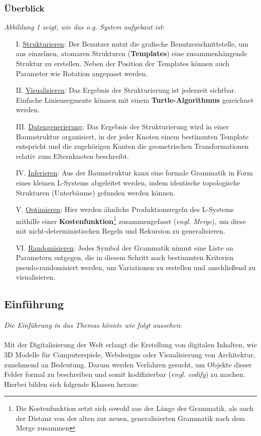 \documentclass[11pt]{article}
\begin{document}
    \subsubsection{Überblick}
    \textit{Abbildung 1 zeigt, wie das o.g. System aufgebaut ist}:
    \begin{itemize}
        \item[I.] \underline{Strukturieren}: Der Benutzer nutzt die grafische Benutzerschnittstelle, um aus
        einzelnen, atomaren Strukturen (\textbf{Templates}) eine zusammenhängende Struktur zu erstellen.
        Neben der Position der Templates können auch Parameter wie Rotation angepasst
        werden.
        \item[II.] \underline{Visualisieren}: Das Ergebnis der Strukturierung ist jederzeit sichtbar.
        Einfache Liniensegmente können mit einem \textbf{Turtle-Algorithmus} gezeichnet werden.
        \item[III.] \underline{Datengenerierung}: Das Ergebnis der Strukturierung wird in einer Baumstruktur
        organisiert, in der jeder Knoten einem bestimmten Template entspricht und die zugehörigen Kanten die
        geometrischen Transformationen relativ zum Elternknoten beschreibt.
        \item[IV.] \underline{Inferieren}: Aus der Baumstruktur kann eine formale Grammatik in Form eines kleinen
        L-Systems abgeleitet werden, indem identische topologische Strukturen (Unterbäume) gefunden werden können.
        \item[V.] \underline{Optimieren}: Hier werden ähnliche Produktionsregeln des L-Systems mithilfe einer
        \textbf{Kostenfunktion}\footnote[1]{Die Kostenfunktion setzt sich sowohl aus der Länge der Grammatik, als
        auch der Distanz von der alten zur neuen, generalisierten Grammatik nach dem Merge zusammen} zusammengefasst
        (\textit{engl. Merge}), um diese mit nicht-deterministischen Regeln und Rekursion zu generalisieren.
        \item[VI.] \underline{Randomisieren}: Jedes Symbol der Grammatik nimmt eine Liste an Parametern entgegen, die
        in diesem Schritt nach bestimmten Kriterien pseudo-randomisiert werden, um Variationen zu erstellen und
        anschließend zu visualisieren.
    \end{itemize}

    \newpage

    \subsection{Einführung}
    \textit{Die Einführung in das Themas könnte wie folgt aussehen}:\\~\\
    Mit der Digitalisierung der Welt erlangt die Erstellung von digitalen Inhalten, wie 3D Modelle für Computerspiele,
    Webdesigns oder Visualisierung von Architektur, zunehmend an Bedeutung.
    Darum werden Verfahren gesucht, um Objekte dieser Felder formal zu beschreiben und somit kodifizierbar
    (\textit{engl. codify}) zu machen.
    Hierbei bilden sich folgende Klassen heraus:
\end{document}
